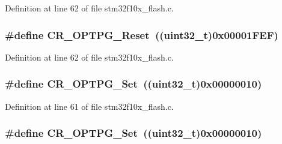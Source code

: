 Definition at line 62 of file stm32f10x\+\_\+flash.\+c.

\subsubsection[{\texorpdfstring{C\+R\+\_\+\+O\+P\+T\+P\+G\+\_\+\+Reset}{CR_OPTPG_Reset}}]{\setlength{\rightskip}{0pt plus 5cm}\#define C\+R\+\_\+\+O\+P\+T\+P\+G\+\_\+\+Reset~(({\bf uint32\+\_\+t})0x00001\+F\+E\+F)}\hypertarget{group___f_l_a_s_h___private___defines_ga9dd2ca46f4e8edfa098e1481699c08b7}{}\label{group___f_l_a_s_h___private___defines_ga9dd2ca46f4e8edfa098e1481699c08b7}


Definition at line 62 of file stm32f10x\+\_\+flash.\+c.

\subsubsection[{\texorpdfstring{C\+R\+\_\+\+O\+P\+T\+P\+G\+\_\+\+Set}{CR_OPTPG_Set}}]{\setlength{\rightskip}{0pt plus 5cm}\#define C\+R\+\_\+\+O\+P\+T\+P\+G\+\_\+\+Set~(({\bf uint32\+\_\+t})0x00000010)}\hypertarget{group___f_l_a_s_h___private___defines_ga84ec77ffaa2a83edeef385e3a36171f8}{}\label{group___f_l_a_s_h___private___defines_ga84ec77ffaa2a83edeef385e3a36171f8}


Definition at line 61 of file stm32f10x\+\_\+flash.\+c.

\subsubsection[{\texorpdfstring{C\+R\+\_\+\+O\+P\+T\+P\+G\+\_\+\+Set}{CR_OPTPG_Set}}]{\setlength{\rightskip}{0pt plus 5cm}\#define C\+R\+\_\+\+O\+P\+T\+P\+G\+\_\+\+Set~(({\bf uint32\+\_\+t})0x00000010)}\hypertarget{group___f_l_a_s_h___private___defines_ga84ec77ffaa2a83edeef385e3a36171f8}{}\label{group___f_l_a_s_h___private___defines_ga84ec77ffaa2a83edeef385e3a36171f8}


